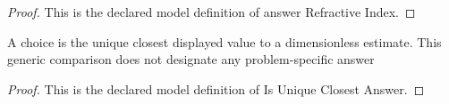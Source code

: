 \begin{proof}
  This is the declared model definition of answer Refractive Index.
\end{proof}
\begin{definition}
  \label{def:physics:phyx-mini-0095:phyxminiproblems-problemphyxmini0095-isuniqueclosestanswer}
  A choice is the unique closest displayed value to a dimensionless estimate. This generic comparison does not designate any problem-specific answer
\end{definition}
\begin{proof}
  This is the declared model definition of Is Unique Closest Answer.
\end{proof}
